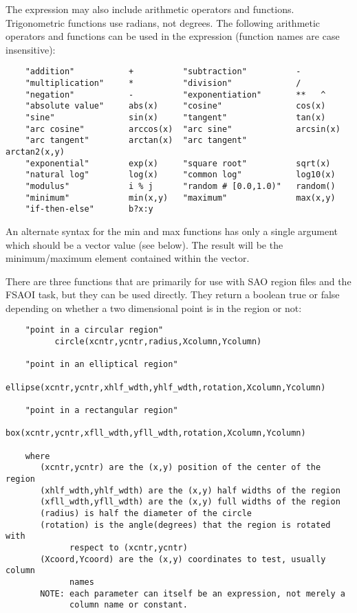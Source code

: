 \documentclass[11pt]{book}
\begin{document}
    The expression may  also include arithmetic operators and functions.
    Trigonometric  functions use  radians,  not degrees.  The  following
    arithmetic  operators and  functions  can be  used in the expression
    (function names are case insensitive):


\begin{verbatim}
    "addition"           +          "subtraction"          -
    "multiplication"     *          "division"             /
    "negation"           -          "exponentiation"       **   ^
    "absolute value"     abs(x)     "cosine"               cos(x)
    "sine"               sin(x)     "tangent"              tan(x)
    "arc cosine"         arccos(x)  "arc sine"             arcsin(x)
    "arc tangent"        arctan(x)  "arc tangent"          arctan2(x,y)
    "exponential"        exp(x)     "square root"          sqrt(x)
    "natural log"        log(x)     "common log"           log10(x)
    "modulus"            i % j      "random # [0.0,1.0)"   random()
    "minimum"            min(x,y)   "maximum"              max(x,y)
    "if-then-else"       b?x:y
\end{verbatim}

    An alternate syntax for the min and max functions  has only a single
    argument which  should be  a  vector value (see  below).  The result
    will be the minimum/maximum element contained within the vector.

    There are three functions that are primarily for use with SAO region
    files and the  FSAOI  task, but they  can  be  used  directly.  They
    return  a  boolean true   or  false  depending   on  whether a   two
    dimensional point is in the region or not:

\begin{verbatim}
    "point in a circular region"
          circle(xcntr,ycntr,radius,Xcolumn,Ycolumn)

    "point in an elliptical region"
         ellipse(xcntr,ycntr,xhlf_wdth,yhlf_wdth,rotation,Xcolumn,Ycolumn)

    "point in a rectangular region"
             box(xcntr,ycntr,xfll_wdth,yfll_wdth,rotation,Xcolumn,Ycolumn)

    where
       (xcntr,ycntr) are the (x,y) position of the center of the region
       (xhlf_wdth,yhlf_wdth) are the (x,y) half widths of the region
       (xfll_wdth,yfll_wdth) are the (x,y) full widths of the region
       (radius) is half the diameter of the circle
       (rotation) is the angle(degrees) that the region is rotated with
             respect to (xcntr,ycntr)
       (Xcoord,Ycoord) are the (x,y) coordinates to test, usually column
             names
       NOTE: each parameter can itself be an expression, not merely a
             column name or constant.
\end{verbatim}
\end{document}
